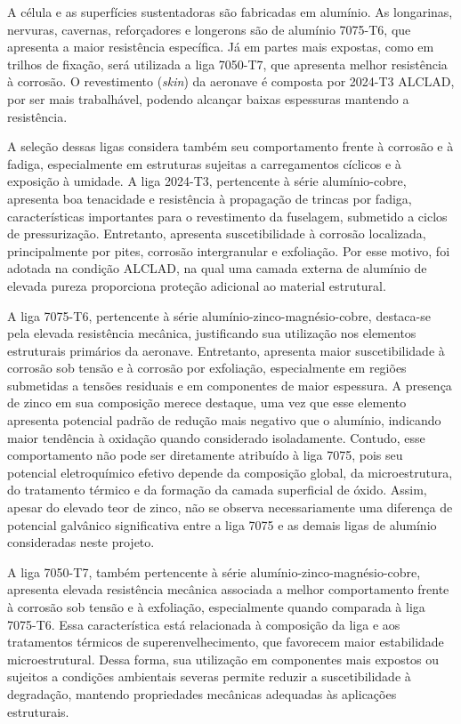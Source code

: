 A célula e as superfícies sustentadoras são fabricadas em alumínio. As longarinas, nervuras, cavernas, reforçadores e longerons são de alumínio 7075-T6, que apresenta a maior resistência específica. Já em partes mais expostas, como em trilhos de fixação, será utilizada a liga 7050-T7, que apresenta melhor resistência à corrosão. O revestimento (\textit{skin}) da aeronave é composta por 2024-T3 ALCLAD, por ser mais trabalhável, podendo alcançar baixas espessuras mantendo a resistência.

A seleção dessas ligas considera também seu comportamento frente à corrosão e à fadiga, especialmente em estruturas sujeitas a carregamentos cíclicos e à exposição à umidade. A liga 2024-T3, pertencente à série alumínio-cobre, apresenta boa tenacidade e resistência à propagação de trincas por fadiga, características importantes para o revestimento da fuselagem, submetido a ciclos de pressurização. Entretanto, apresenta suscetibilidade à corrosão localizada, principalmente por pites, corrosão intergranular e exfoliação. Por esse motivo, foi adotada na condição ALCLAD, na qual uma camada externa de alumínio de elevada pureza proporciona proteção adicional ao material estrutural.

A liga 7075-T6, pertencente à série alumínio-zinco-magnésio-cobre, destaca-se pela elevada resistência mecânica, justificando sua utilização nos elementos estruturais primários da aeronave. Entretanto, apresenta maior suscetibilidade à corrosão sob tensão e à corrosão por exfoliação, especialmente em regiões submetidas a tensões residuais e em componentes de maior espessura. A presença de zinco em sua composição merece destaque, uma vez que esse elemento apresenta potencial padrão de redução mais negativo que o alumínio, indicando maior tendência à oxidação quando considerado isoladamente. Contudo, esse comportamento não pode ser diretamente atribuído à liga 7075, pois seu potencial eletroquímico efetivo depende da composição global, da microestrutura, do tratamento térmico e da formação da camada superficial de óxido. Assim, apesar do elevado teor de zinco, não se observa necessariamente uma diferença de potencial galvânico significativa entre a liga 7075 e as demais ligas de alumínio consideradas neste projeto.

A liga 7050-T7, também pertencente à série alumínio-zinco-magnésio-cobre, apresenta elevada resistência mecânica associada a melhor comportamento frente à corrosão sob tensão e à exfoliação, especialmente quando comparada à liga 7075-T6. Essa característica está relacionada à composição da liga e aos tratamentos térmicos de superenvelhecimento, que favorecem maior estabilidade microestrutural. Dessa forma, sua utilização em componentes mais expostos ou sujeitos a condições ambientais severas permite reduzir a suscetibilidade à degradação, mantendo propriedades mecânicas adequadas às aplicações estruturais.

